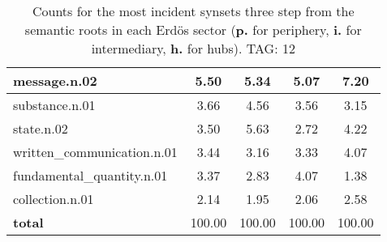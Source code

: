 \begin{table}[h!]
\begin{center}
\begin{tabular}{| l || c | c | c | c |}
message.n.02 & 5.50  & 5.34  & 5.07  & 7.20 \\\hline
substance.n.01 & 3.66  & 4.56  & 3.56  & 3.15 \\\hline
state.n.02 & 3.50  & 5.63  & 2.72  & 4.22 \\\hline
written\_communication.n.01 & 3.44  & 3.16  & 3.33  & 4.07 \\\hline
fundamental\_quantity.n.01 & 3.37  & 2.83  & 4.07  & 1.38 \\\hline
collection.n.01 & 2.14  & 1.95  & 2.06  & 2.58 \\\hline\hline
{{\bf total}} & 100.00  & 100.00  & 100.00  & 100.00 \\\hline
\end{tabular}
\caption{Counts for the most incident synsets three step from the semantic roots in each Erd\"os sector ({\bf p.} for periphery, {\bf i.} for intermediary, {\bf h.} for hubs). TAG: 12}
\end{center}
\end{table}